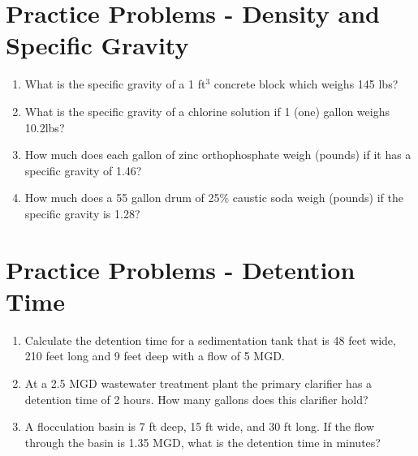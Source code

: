 \vspace{1cm}
\section*{Practice Problems - Density and Specific Gravity}
\begin{enumerate}

\item What is the specific gravity of a 1 ft$^3$ concrete block which weighs 145 lbs?

\item What is the specific gravity of a chlorine solution if 1 (one) gallon weighs 10.2lbs?

\item How much does each gallon of zinc orthophosphate weigh (pounds) if it has a specific gravity of 1.46?

\item How much does a 55 gallon drum of 25\% caustic soda weigh (pounds) if the specific gravity is 1.28?

\end{enumerate}

\section*{Practice Problems - Detention Time}
\begin{enumerate}

\item Calculate the detention time for a sedimentation tank that is 48 feet wide, 210 feet long and 9 feet deep with a flow of 5 MGD.\\
\item  At a 2.5 MGD wastewater treatment plant the primary clarifier has a detention time of 2 hours. How many gallons does this clarifier hold?\\
\item A flocculation basin is 7 ft deep, 15 ft wide, and 30 ft long. If the flow through the basin is 1.35 MGD, what is the detention time in minutes?\\

\end{enumerate}

